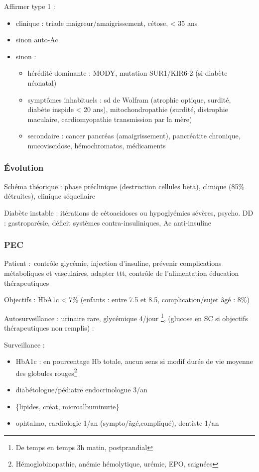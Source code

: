 \documentclass[11pt]{article}
\begin{document}
Affirmer type 1 :
\begin{itemize}
\item clinique : triade maigreur/amaigrissement, cétose, < 35 ans
\item sinon auto-Ac
\item sinon :
\begin{itemize}
\item hérédité dominante : MODY, mutation SUR1/KIR6-2 (si diabète néonatal)
\item symptômes inhabituels : sd de Wolfram (atrophie optique, surdité, diabète
inspide < 20 ans), mitochondropathie (surdité, distrophie maculaire,
cardiomyopathie transmission par la mère)
\item secondaire : cancer pancréas (amaigrissement), pancréatite chronique,
mucoviscidose, hémochromatos, médicaments
\end{itemize}
\end{itemize}

\subsubsection{Évolution}
\label{sec:orgb4bf47c}
Schéma théorique : phase préclinique (destruction cellules beta), clinique (85\% détruites), clinique séquellaire

Diabète instable : itérations de cétoacidoses ou hypoglyémies sévères,
psycho. DD : gastroparésie, déficit systèmes contra-insuliniques, Ac anti-insuline

\subsubsection{PEC}
\label{sec:org4773128}
Patient : contrôle glycémie, injection d'insuline, prévenir complications
métaboliques et vasculaires, adapter ttt, contrôle de l'alimentation \thus
éducation thérapeutiques

Objectifs : HbA1c < 7\% (enfants : entre 7.5 et 8.5, complication/sujet âgé : 8\%)

Autosurveillance : urinaire rare, glycémique 4/jour \footnote{De temps en temps 3h matin, postprandial}, (glucose en SC si
objectifs thérapeutiques non remplis) :

Surveillance :
\begin{itemize}
\item HbA1c : en pourcentage Hb totale, aucun sens si modif durée de vie moyenne des globules rouges\footnote{Hémoglobinopathie, anémie hémolytique, urémie, EPO, saignées}
\item diabétologue/pédiatre endocrinologue 3/an
\item \{lipides, créat, microalbuminurie\}
\item ophtalmo, cardiologie 1/an (sympto/âgé,compliqué), dentiste 1/an
\end{itemize}
\end{document}
